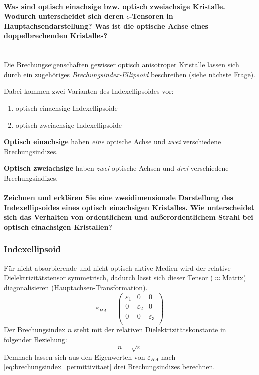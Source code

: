 \documentclass[a4paper, 11pt, ngerman, parskip=half-]{scrartcl}
\newcommand{\myparagraph}[1]{\paragraph{#1}\mbox{}\\}
\begin{document}
\myparagraph{Was sind optisch einachsige bzw. optisch zweiachsige Kristalle. Wodurch unterscheidet sich deren $\epsilon$-Tensoren in Hauptachsendarstellung? Was ist die optische Achse eines doppelbrechenden Kristalles?}
%
Die Brechungseigenschaften gewisser optisch anisotroper Kristalle lassen sich durch ein zugehöriges \textit{Brechungsindex-Ellipsoid} beschreiben (siehe nächste Frage).

Dabei kommen zwei Varianten des Indexellipsoides vor:
\begin{enumerate}
    \item optisch einachsige Indexellipsoide
    \item optisch zweiachsige Indexellipsoide
\end{enumerate}

\textbf{Optisch einachsige} haben \textit{eine} optische Achse und \textit{zwei} verschiedene Brechungsindizes.

\textbf{Optisch zweiachsige} haben \textit{zwei} optische Achsen und \textit{drei} verschiedene Brechungsindizes.


\paragraph{Zeichnen und erklären Sie eine zweidimensionale Darstellung des Indexellipsoides eines optisch einachsigen Kristalles. Wie unterscheidet sich das Verhalten von ordentlichem und außerordentlichem Strahl bei optisch einachsigen Kristallen?}
%
\subsubsection*{Indexellipsoid}
Für nicht-absorbierende und nicht-optisch-aktive Medien wird der relative Dielektrizitätstensor symmetrisch, dadurch lässt sich dieser Tensor ($\approx$Matrix) diagonalisieren (Hauptachsen-Transformation).
\[\varepsilon_{HA} = \begin{pmatrix}
        \varepsilon_1 & 0             & 0             \\
        0             & \varepsilon_2 & 0             \\
        0             & 0             & \varepsilon_3 \\
    \end{pmatrix}\]
Der Brechungsindex $n$ steht mit der relativen Dielektrizitätskonstante in folgender Beziehung:
\begin{equation}
    \label{eq:brechungsindex_permittivitaet}
    n = \sqrt{\varepsilon}
\end{equation}
Demnach lassen sich aus den Eigenwerten von $\varepsilon_{HA}$ nach \autoref{eq:brechungsindex_permittivitaet} drei Brechungsindizes berechnen.
\end{document}
